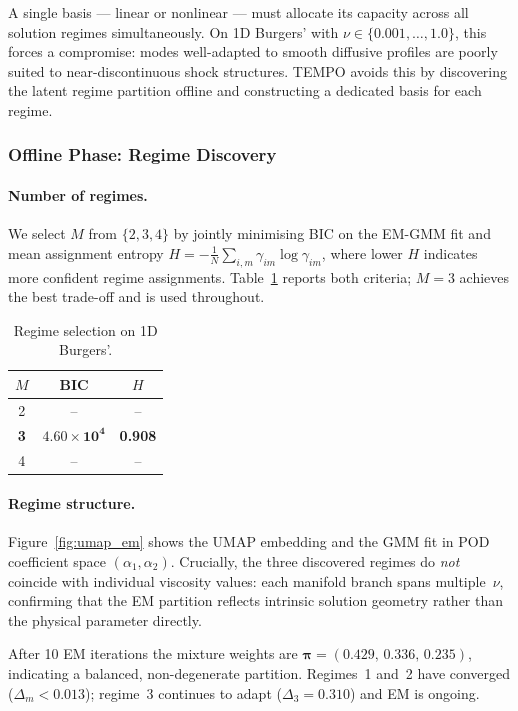 \documentclass{article}
\begin{document}
A single basis — linear or nonlinear — must allocate its capacity across
all solution regimes simultaneously.
On 1D Burgers' with $\nu\in\{0.001,\ldots,1.0\}$, this forces a compromise:
modes well-adapted to smooth diffusive profiles are poorly suited to
near-discontinuous shock structures.
TEMPO avoids this by discovering the latent regime partition offline and
constructing a dedicated basis for each regime.

\subsubsection{Offline Phase: Regime Discovery}
\label{sec:offline_exp}

\paragraph{Number of regimes.}
We select $M$ from $\{2,3,4\}$ by jointly minimising BIC on the EM-GMM fit
and mean assignment entropy
$H = -\frac{1}{N}\sum_{i,m}\gamma_{im}\log\gamma_{im}$,
where lower $H$ indicates more confident regime assignments.
Table~\ref{tab:regime_selection} reports both criteria;
$M{=}3$ achieves the best trade-off and is used throughout.

\begin{table}[h]
\centering
\caption{Regime selection on 1D Burgers'.}
\label{tab:regime_selection}
\begin{tabular}{ccc}
\toprule
$M$ & BIC & $H$ \\
\midrule
2          & -- & -- \\
\textbf{3} & $\mathbf{4.60{\times}10^{4}}$ & \textbf{0.908} \\
4          & -- & -- \\
\bottomrule
\end{tabular}
\end{table}

\paragraph{Regime structure.}
Figure~\ref{fig:umap_em} shows the UMAP embedding and the GMM
fit in POD coefficient space $(\alpha_1,\alpha_2)$.
Crucially, the three discovered regimes do \emph{not} coincide with
individual viscosity values: each manifold branch spans multiple~$\nu$,
confirming that the EM partition reflects intrinsic solution geometry rather
than the physical parameter directly.

After 10 EM iterations the mixture weights are
$\boldsymbol{\pi}{=}(0.429,\,0.336,\,0.235)$, indicating a balanced,
non-degenerate partition.
Regimes~1 and~2 have converged ($\Delta_m < 0.013$);
regime~3 continues to adapt ($\Delta_3{=}0.310$) and EM is ongoing.
\end{document}
